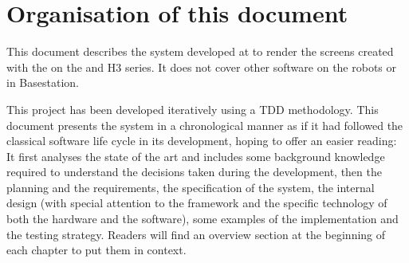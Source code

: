 \section{Organisation of this document}
This document describes the system developed at \company to render the screens created with the \se on the  and H3 series.
It does not cover other software on the robots or in Basestation.

This project has been developed iteratively using a \ac{TDD} methodology. 
This document presents the system in a chronological manner as if it had followed the classical software life cycle in its development, hoping to offer an easier reading:
It first analyses the state of the art and includes some background knowledge required to understand the decisions taken during the development, then the planning and the requirements, the specification of the system, the internal design (with special attention to the framework and the specific technology of both the hardware and the software), some examples of the implementation and the testing strategy.
Readers will find an overview section at the beginning of each chapter to put them in context.